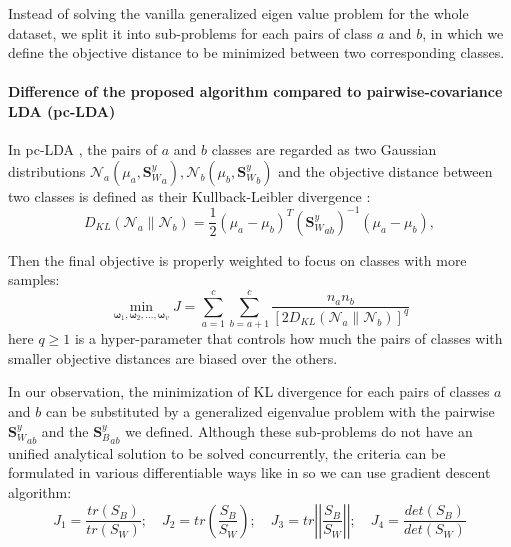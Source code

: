     Instead of solving the vanilla generalized eigen value problem for the whole dataset, we split it into sub-problems for each pairs of class $a$ and $b$, in which we define the objective distance to be minimized between two corresponding classes.

    \paragraph{Difference of the proposed algorithm compared to pairwise-covariance LDA (pc-LDA)}
        In pc-LDA \cite{kong2014pairwise}, the pairs of $a$ and $b$ classes are regarded as two Gaussian distributions $\mathcal{N}_a(\mu_a,{\boldsymbol{S}_W^y}_a), \mathcal{N}_b(\mu_b,{\boldsymbol{S}_W^y}_b)$ and the objective distance between two classes is defined as their Kullback-Leibler divergence \cite{kullback1951}:
        \begin{equation}
            D_{KL}\left(\mathcal{N}_a\parallel\mathcal{N}_b\right)=\frac{1}{2}\left(\mu_a-\mu_b\right)^{T}{\left({\boldsymbol{S}_W^y}_{ab}\right)}^{-1}\left(\mu_a-\mu_b\right),
        \end{equation}

        Then the final objective is properly weighted to focus on classes with more samples:
        \begin{equation}
            \operatorname*{min}_{\boldsymbol{\omega}_1, \boldsymbol{\omega}_2,...,
            \boldsymbol{\omega}_v}{J}=\sum_{a=1}^{c}\sum_{b=a+1}^{c}{\frac{n_an_b}{{[2D_{KL}\left(\mathcal{N}_a\parallel\mathcal{N}_b\right)]}^q}}
            \label{eq:pc-LDA}
        \end{equation}
        here $q\ge1$ is a hyper-parameter that controls how much the pairs of classes with smaller objective distances are biased over the others.

        In our observation, the minimization of KL divergence for each pairs of classes $a$ and $b$ can be substituted by a generalized eigenvalue problem with the pairwise ${\boldsymbol{S}_W^y}_{ab}$ and the ${\boldsymbol{S}_B^y}_{ab}$ we defined. Although these sub-problems do not have an unified analytical solution to be solved concurrently, the criteria can be formulated in various differentiable ways like in \cite{fukunaga1990441} so we can use gradient descent algorithm:
        \begin{equation}
            J_1=\frac{tr(S_B)}{tr(S_W)};\quad 
            J_2=tr\left(\frac{S_B}{S_W}\right);\quad
            J_3=tr\left|\left|\frac{S_B}{S_W}\right|\right|;\quad
            J_4=\frac{det(S_B)}{det(S_W)}
        \end{equation}

